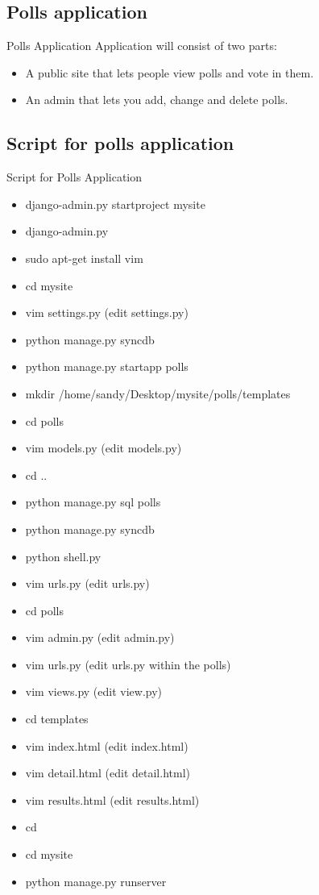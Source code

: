 \subsection{Polls application}
\begin{frame}{Polls Application}
Application will consist of two parts:
\begin{itemize}
\item<2-> A public site that lets people view polls and vote in them.
\item<3-> An admin that lets you add, change and delete polls.
\end{itemize}
\end{frame}

\newpage
\subsection{Script for polls application}
\begin{frame}{Script for Polls Application}
\begin{itemize}
\item<2->django-admin.py startproject mysite
\item<3->django-admin.py
\item<4->sudo apt-get install vim
\item<5->cd mysite
\item<6->vim settings.py   (edit settings.py)
\item<7->python manage.py syncdb
\item<8->python manage.py startapp polls
\item<9->mkdir /home/sandy/Desktop/mysite/polls/templates
\item<10->cd polls
\item<11->vim models.py     (edit models.py)
\item<12->cd ..
\item<13->python manage.py sql polls
\item<14->python manage.py syncdb
\item<15->python shell.py
\end{itemize}
\end{frame}
\newpage
\begin{frame}
\begin{itemize}
\item<2->vim urls.py       (edit urls.py)
\item<3->cd polls
\item<4->vim admin.py      (edit admin.py)
\item<5->vim urls.py       (edit urls.py within the polls)
\item<6->vim views.py      (edit view.py)
\item<7->cd templates
\item<8->vim index.html    (edit index.html)
\item<9->vim detail.html   (edit detail.html)
\item<10->vim results.html  (edit results.html)
\item<11->cd
\item<12->cd mysite
\item<13->python manage.py runserver
\end{itemize}
\end{frame}




